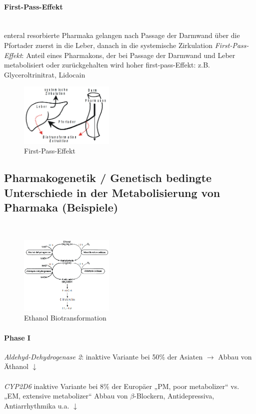 \documentclass[10pt,a4paper]{report}
\begin{document}
\paragraph{First-Pass-Effekt} \mbox{} \\
enteral resorbierte Pharmaka gelangen nach Passage der Darmwand über die Pfortader zuerst in die Leber, danach in die systemische Zirkulation \textit{First-Pass-Effekt}: Anteil eines Pharmakons, der bei Passage der Darmwand und Leber metabolisiert 
oder zurückgehalten wird hoher first-pass-Effekt: z.B. Glyceroltrinitrat, Lidocain
\begin{figure}[h]
	\centering 
	\includegraphics[width=0.4\textwidth]{firstpass.png} 
	\caption{First-Pass-Effekt} 
	\label{fig:FirstPass}
\end{figure}
\subsection{Pharmakogenetik / Genetisch bedingte Unterschiede in der Metabolisierung von Pharmaka (Beispiele)} \mbox{} \\
\begin{figure}[h]
	\centering 
	\includegraphics[width=0.4\textwidth]{ethanolbiotransformation.png} 
	\caption{Ethanol Biotransformation} 
	\label{fig:EthanolBiotransformation}
\end{figure}
\paragraph{Phase I} 
\textit{Aldehyd-Dehydrogenase 2}: inaktive Variante bei 50\% der Asiaten $\rightarrow$ Abbau von Äthanol $\downarrow$\\ \\
\textit{CYP2D6} 	inaktive Variante bei 8\% der Europäer „PM, poor metabolizer“ vs. „EM, extensive metabolizer“ Abbau von $\beta$-Blockern, Antidepressiva, Antiarrhythmika u.a. $\downarrow$
\end{document}
